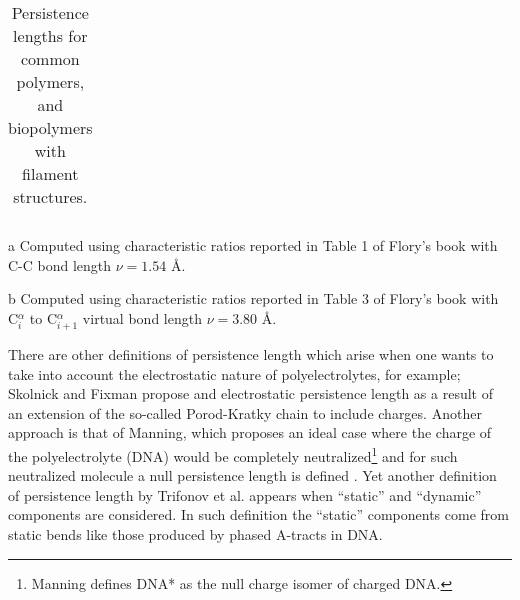 \begin{table}[htbp]
\begin{center}
\begin{threeparttable}
\begin{tabular}{l|r|c}
\hline
\end{tabular}
\begin{tablenotes}
\item [a] Computed using  characteristic ratios reported in Table 1
  of Flory's book \cite{flory1969} with C-C bond length $\nu = 1.54$ \AA.
\item [b] Computed using  characteristic ratios reported in Table 3
  of Flory's book \cite{flory1969} with C$^{\alpha}_{i}$ to C$^{\alpha}_{i+1}$ virtual
  bond length $\nu = 3.80$ \AA.
\end{tablenotes}
\end{threeparttable}
\caption{Persistence lengths for common polymers, and biopolymers with
  filament structures.}
\label{tab:perval}
\end{center}
\end{table}


There are other definitions of persistence length which arise when one
wants   to   take   into   account   the   electrostatic   nature   of
polyelectrolytes, for example; Skolnick and Fixman \cite{skolnick1977}
propose  and  electrostatic  persistence  length  as a  result  of  an
extension  of the  so-called  Porod-Kratky chain  to include  charges.
Another  approach is  that of  Manning, which  proposes an  ideal case
where  the charge  of the  polyelectrolyte (DNA)  would  be completely
neutralized\footnote{Manning defines DNA* as the null charge isomer of
  charged DNA.}  and for  such neutralized molecule a null persistence
length  is  defined  \cite{manning2006}.   Yet another  definition  of
persistence length by Trifonov et al. \cite{trifonov1987} appears when
``static''  and  ``dynamic''   components  are  considered.   In  such
definition the ``static'' components come from static bends like those
produced by phased A-tracts in DNA.

